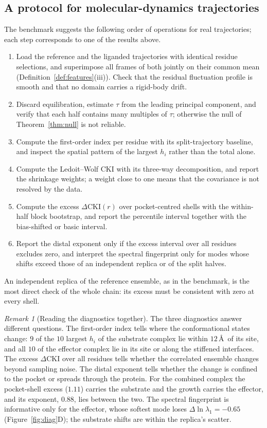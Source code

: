\documentclass[11pt,reqno]{amsart}
\theoremstyle{plain}
\theoremstyle{definition}
\theoremstyle{remark}
\newtheorem{remark}[theorem]{Remark}
\numberwithin{equation}{section}
\newcommand{\DCKI}{\Delta\mathrm{CKI}}
\begin{document}
\subsection*{A protocol for molecular-dynamics trajectories}
The benchmark suggests the following order of operations for real trajectories; each step corresponds to one of the results above.
\begin{enumerate}[label=(\arabic*),leftmargin=*]
\item Load the reference and the liganded trajectories with identical residue selections, and superimpose all frames of both jointly on their common mean (Definition~\ref{def:features}(iii)). Check that the residual fluctuation profile is smooth and that no domain carries a rigid-body drift.
\item Discard equilibration, estimate $\tau$ from the leading principal component, and verify that each half contains many multiples of $\tau$; otherwise the null of Theorem~\ref{thm:null} is not reliable.
\item Compute the first-order index per residue with its split-trajectory baseline, and inspect the spatial pattern of the largest $h_i$ rather than the total alone.
\item Compute the Ledoit--Wolf CKI with its three-way decomposition, and report the shrinkage weights; a weight close to one means that the covariance is not resolved by the data.
\item Compute the excess $\DCKI(r)$ over pocket-centred shells with the within-half block bootstrap, and report the percentile interval together with the bias-shifted or basic interval.
\item Report the distal exponent only if the excess interval over all residues excludes zero, and interpret the spectral fingerprint only for modes whose shifts exceed those of an independent replica or of the split halves.
\end{enumerate}
An independent replica of the reference ensemble, as in the benchmark, is the most direct check of the whole chain: its excess must be consistent with zero at every shell.

\begin{remark}[Reading the diagnostics together]
The three diagnostics answer different questions. The first-order index tells where the conformational states change: $9$ of the $10$ largest $h_i$ of the substrate complex lie within $12$\,\AA\ of its site, and all $10$ of the effector complex lie in its site or along the stiffened interfaces. The excess $\DCKI$ over all residues tells whether the correlated ensemble changes beyond sampling noise. The distal exponent tells whether the change is confined to the pocket or spreads through the protein. For the combined complex the pocket-shell excess ($1.11$) carries the substrate and the growth carries the effector, and its exponent, $0.88$, lies between the two. The spectral fingerprint is informative only for the effector, whose softest mode loses $\Delta\ln\lambda_1=-0.65$ (Figure~\ref{fig:diag}D); the substrate shifts are within the replica's scatter.
\end{remark}
\end{document}
